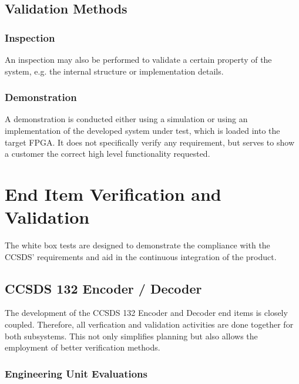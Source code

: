 \section{Validation Methods}
\subsection{Inspection}

An inspection may also be performed to validate a certain property of the system, e.g. the internal structure or implementation details.

\subsection{Demonstration}

A demonstration is conducted either using a simulation or using an implementation of the developed system under test, which is loaded into the target FPGA. It does not specifically verify any requirement, but serves to show a customer the correct high level functionality requested.


\chapter{End Item Verification and Validation}
The white box tests are designed to demonstrate the compliance with the CCSDS' requirements and aid in the continuous integration of the product. 


\section{CCSDS 132 Encoder / Decoder}

The development of the CCSDS 132 Encoder and Decoder end items is closely coupled. Therefore, all verfication and validation activities are done together for both subsystems. This not only simplifies planning but also allows the employment of better verification methods.

\subsection{Engineering Unit Evaluations}

